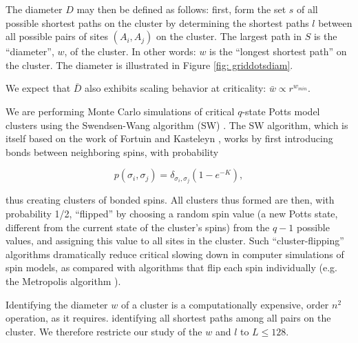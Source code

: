 \documentclass[pre,preprint]{revtex4}
\begin{document}
The diameter $D$ may then be defined as follows:  first, form the set $s$ of all possible shortest paths on the cluster by determining the shortest paths $l$ between all possible pairs of sites $(A_i, A_j)$ on the cluster. The largest path in $S$ is the ``diameter'', $w$, of the cluster.  In other words: $w$ is the ``longest shortest path'' on the cluster.  The diameter is illustrated in Figure \ref{fig: griddotsdiam}.

We expect that $\bar{D}$ also exhibits scaling behavior at criticality: $\bar{w} \propto r^{w_{min}}$.

We are performing Monte Carlo simulations of critical $q$-state Potts model clusters using the Swendsen-Wang algorithm (SW) \cite{SwWa86, NeBa99}.  The SW algorithm, which is itself based on the work of Fortuin and Kasteleyn \cite{FoKa}, works by first introducing bonds between neighboring spins, with probability 

\begin{equation}
p(\sigma_i,\sigma_j) = \delta_{\sigma_i, \sigma_j} (1-e^{-K}),
\end{equation}  

thus creating clusters of bonded spins.   All clusters thus formed are then, with probability 1/2, ``flipped'' by choosing a random spin value (a new Potts state, different from the current state of the cluster's spins) from the $q-1$ possible values, and assigning this value to all sites in the cluster.  Such ``cluster-flipping'' algorithms dramatically reduce critical slowing down in computer simulations of spin models, as compared with algorithms that flip each spin individually \cite{NeBa99} (e.g. the Metropolis algorithm \cite{Met}). 

Identifying the diameter $w$ of a cluster is a computationally expensive, order $n^2$ operation, as it requires. identifying all shortest paths among all pairs on the cluster.  We therefore restricte our study of the $w$ and $l$ to $L \le 128$. 

\end{document}
